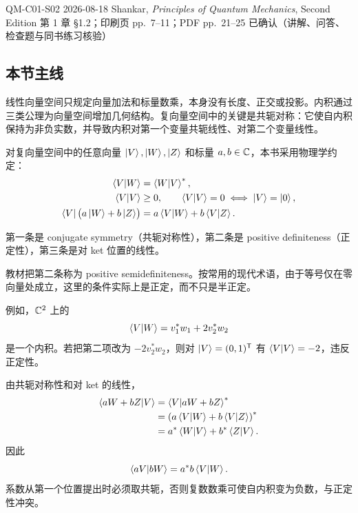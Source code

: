 \studymeta
  {QM-C01-S02}
  {2026-08-18}
  {Shankar, \textit{Principles of Quantum Mechanics}, Second Edition}
  {第 1 章 \S 1.2；印刷页 pp.~7--11；PDF pp.~21--25}
  {已确认（讲解、问答、检查题与同书练习核验）}

\subsection{本节主线}

线性向量空间只规定向量加法和标量数乘，本身没有长度、正交或投影。内积通过三类公理为向量空间增加几何结构。复向量空间中的关键是共轭对称：它使自内积保持为非负实数，并导致内积对第一个变量共轭线性、对第二个变量线性。



对复向量空间中的任意向量 $\left|V\right\rangle,\left|W\right\rangle,\left|Z\right\rangle$ 和标量 $a,b\in\mathbb{C}$，本书采用物理学约定：
\begin{align}
  \left\langle V \middle| W \right\rangle &= \left\langle W \middle| V \right\rangle^{*},
  \label{eq:QM-C01-S02-conjugate-symmetry}\\
  \left\langle V \middle| V \right\rangle &\geq 0,
  \qquad \left\langle V \middle| V \right\rangle=0\iff\left|V\right\rangle=\left|0\right\rangle,
  \label{eq:QM-C01-S02-positive-definite}\\
  \left\langle V\right|\bigl(a\left|W\right\rangle+b\left|Z\right\rangle\bigr)
    &=a\left\langle V \middle| W \right\rangle+b\left\langle V \middle| Z \right\rangle.
  \label{eq:QM-C01-S02-linear-ket}
\end{align}

第一条是 conjugate symmetry（共轭对称性），第二条是 positive definiteness（正定性），第三条是对 ket 位置的线性。

\begin{remark}
教材把第二条称为 positive semidefiniteness。按常用的现代术语，由于等号仅在零向量处成立，这里的条件实际上是正定，而不只是半正定。
\end{remark}

例如，$\mathbb{C}^2$ 上的
\[
  \left\langle V \middle| W \right\rangle=v_1^*w_1+2v_2^*w_2
\]
是一个内积。若把第二项改为 $-2v_2^*w_2$，则对 $\left|V\right\rangle=(0,1)^{\mathsf T}$ 有 $\left\langle V \middle| V \right\rangle=-2$，违反正定性。


由共轭对称性和对 ket 的线性，
\begin{align*}
  \left\langle aW+bZ \middle| V \right\rangle
  &=\left\langle V \middle| aW+bZ \right\rangle^{*}\\
  &=\left(a\left\langle V \middle| W \right\rangle+b\left\langle V \middle| Z \right\rangle\right)^*\\
  &=a^*\left\langle W \middle| V \right\rangle+b^*\left\langle Z \middle| V \right\rangle.
\end{align*}
因此
\begin{equation}
  \left\langle aV \middle| bW \right\rangle=a^*b\left\langle V \middle| W \right\rangle.
  \label{eq:QM-C01-S02-scalar-extraction}
\end{equation}
系数从第一个位置提出时必须取共轭，否则复数数乘可使自内积变为负数，与正定性冲突。

